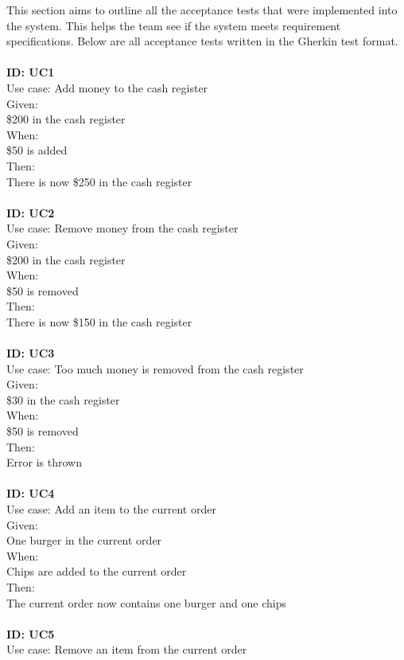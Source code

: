 This section aims to outline all the acceptance tests that were implemented into the system. This helps the team see if the system meets requirement specifications. Below are all acceptance tests written in the Gherkin test format.\\
\\
\textbf{ID: UC1\\}
Use case: Add money to the cash register \\
Given: \\
\$200 in the cash register\\
When: \\
\$50 is added\\
Then:\\
There is now \$250 in the cash register\\
\\
\textbf{ID: UC2\\}
Use case: Remove money from the cash register\\
Given: \\
\$200 in the cash register\\
When: \\
\$50 is removed\\
Then:\\
There is now \$150 in the cash register\\
\\
\textbf{ID: UC3\\}
Use case: Too much money is removed from the cash register\\
Given: \\
\$30 in the cash register\\
When: \\
\$50 is removed\\
Then:\\
Error is thrown\\
\\
\textbf{ID: UC4\\}
Use case: Add an item to the current order\\
Given: \\
One burger in the current order\\
When: \\
Chips are added to the current order\\
Then:\\
The current order now contains one burger and one chips\\
\\
\textbf{ID: UC5\\}
Use case: Remove an item from the current order\\

